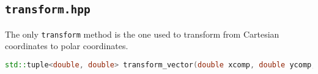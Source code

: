 \documentclass[hidelinks,12pt]{article}
\begin{document}
\subsection{\texttt{transform.hpp}}
The only \texttt{transform} method is the one used to transform from Cartesian coordinates to polar coordinates.
\begin{lstlisting}[language=C++,basicstyle={\footnotesize\ttfamily}]
std::tuple<double, double> transform_vector(double xcomp, double ycomp, double r, double phi);
\end{lstlisting}
\end{document}
